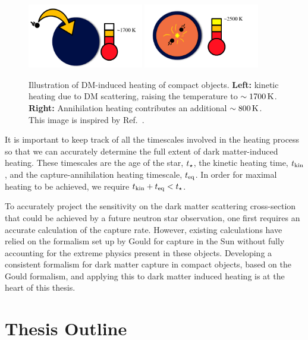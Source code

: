 \begin{figure}[!t]
    \centering
    \includegraphics[width=0.45\textwidth]{kin_heat_NS.pdf}
    \includegraphics[width=0.45\textwidth]{ann_heat_NS.pdf}
    \caption[Illustration of DM-induced heating of compact objects.]{Illustration of DM-induced heating of compact objects. \textbf{Left:} kinetic heating due to DM scattering, raising the temperature to $\sim 1700 {\rm \,K}$. \textbf{Right:} Annihilation heating contributes an additional $\sim 800{\rm \,K}$. This image is inspired by Ref.~\cite{Raj:2017wrv_feb_Neutronstarsdark}.}
    \label{ch1:fig:cartoon_NS_heat}
\end{figure}

It is important to keep track of all the timescales involved in the heating process so that we can accurately determine the full extent of dark matter-induced heating. These timescales are the age of the star, $t_\star$, the kinetic heating time, $t_{\rm kin}$, and the capture-annihilation heating timescale, $t_{\rm eq}$. In order for maximal heating to be achieved, we require $t_{\rm kin} + t_{\rm eq} < t_\star$. 

To accurately project the sensitivity on the dark matter scattering cross-section that could be achieved by a future neutron star observation, one first requires an accurate calculation of the capture rate. However, existing calculations have relied on the formalism set up by Gould for capture in the Sun without fully accounting for the extreme physics present in these objects. Developing a consistent formalism for dark matter capture in compact objects, based on the Gould formalism, and applying this to dark matter induced heating is at the heart of this thesis.  

\section{Thesis Outline}

